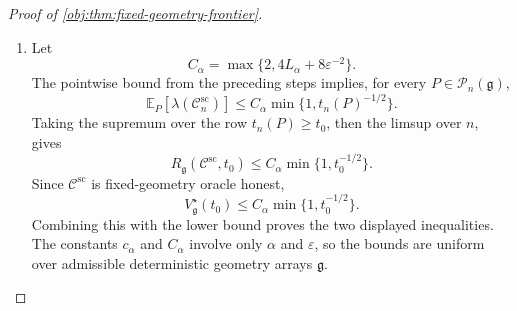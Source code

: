 \begin{proof}[Proof of \cref{obj:thm:fixed-geometry-frontier}]
\begin{enumerate}
\item Let
\[
C_\alpha=\max\{2,4L_\alpha+8\varepsilon^{-2}\}.
\]
The pointwise bound from the preceding steps implies, for every \(P\in\mathcal P_n(\mathfrak g)\),
\[
\mathbb E_P[\lambda(\mathscr C_n^{\mathrm{sc}})]
\le
C_\alpha\min\{1,t_n(P)^{-1/2}\}.
\]
Taking the supremum over the row \(t_n(P)\ge t_0\), then the limsup over \(n\), gives
\[
R_{\mathfrak g}(\mathscr C^{\mathrm{sc}},t_0)
\le
C_\alpha\min\{1,t_0^{-1/2}\}.
\]
Since \(\mathscr C^{\mathrm{sc}}\) is fixed-geometry oracle honest,
\[
V_{\mathfrak g}^{\star}(t_0)
\le
C_\alpha\min\{1,t_0^{-1/2}\}.
\]
Combining this with the lower bound proves the two displayed inequalities.  The constants \(c_\alpha\) and \(C_\alpha\) involve only \(\alpha\) and \(\varepsilon\), so the bounds are uniform over admissible deterministic geometry arrays \(\mathfrak g\).
\end{enumerate}
\end{proof}

